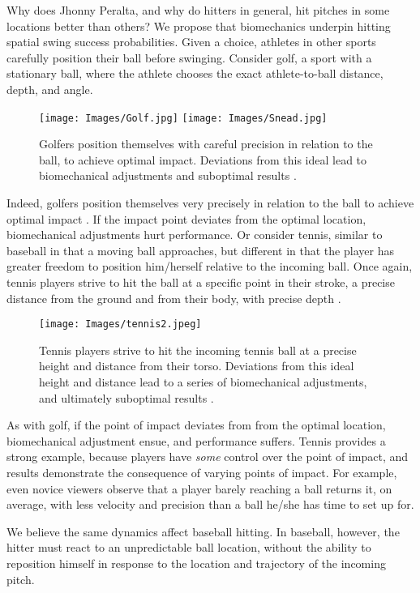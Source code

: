 Why does Jhonny Peralta, and why do hitters in general, hit pitches in some locations better than others? We propose that biomechanics underpin hitting spatial swing success probabilities. Given a choice, athletes in other sports carefully position their ball before swinging. Consider golf, a sport with a stationary ball, where the athlete chooses the exact athlete-to-ball distance, depth, and angle. 
  \begin{figure}[H]
	\centering	
	\texttt{[image: Images/Golf.jpg]}
  \texttt{[image: Images/Snead.jpg]}
	\caption{Golfers position themselves with careful precision in relation to the ball, to achieve optimal impact. Deviations from this ideal lead to biomechanical adjustments and suboptimal results \citep{Cochran2005}.}
	\label{fig:golf}
	\end{figure}
Indeed, golfers position themselves very precisely in relation to the ball to achieve optimal impact \citep{Cochran2005}. If the impact point deviates from the optimal location, biomechanical adjustments hurt performance. Or consider tennis, similar to baseball in that a moving ball approaches, but different in that the player has greater freedom to position him/herself relative to the incoming ball. Once again, tennis players strive to hit the ball at a specific point in their stroke, a precise distance from the ground and from their body, with precise depth \citep{Elliott2006}. 
  \begin{figure}[H]
	\centering	
	\texttt{[image: Images/tennis2.jpeg]}
	\caption{Tennis players strive to hit the incoming tennis ball at a precise height and distance from their torso. Deviations from this ideal height and distance lead to a series of biomechanical adjustments, and ultimately suboptimal results \citep{Elliott2006}.}
	\end{figure}
As with golf, if the point of impact deviates from from the optimal location, biomechanical adjustment ensue, and performance suffers. Tennis provides a strong example, because players have {\it some} control over the point of impact, and results demonstrate the consequence of varying points of impact. For example, even novice viewers observe that a player barely reaching a ball returns it, on average, with less velocity and precision than a ball he/she has time to set up for.  

We believe the same dynamics affect baseball hitting. In baseball, however, the hitter must react to an unpredictable ball location, without the ability to reposition himself in response to the location and trajectory of the incoming pitch.

